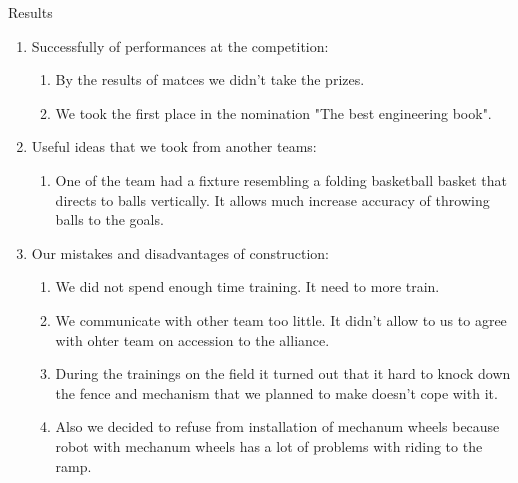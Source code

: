 Results
\begin{enumerate}
  \item Successfully of performances at the competition:
  \begin{enumerate}
	\item By the results of matces we didn't take the prizes.
	
	\item We took the first place in the nomination "The best engineering book".
	
  \end{enumerate}
  
  \item Useful ideas that we took from another teams:
  \begin{enumerate}
  	
	
	
	
	
	
	\item One of the team had a fixture resembling a folding basketball basket that directs to balls vertically. It allows much increase accuracy of throwing balls to the goals.
	
  \end{enumerate}
  
  \item Our mistakes and disadvantages of construction:
  \begin{enumerate}
  	\item We did not spend enough time training. It need to more train.
  	
  	\item We communicate with other team too little. It didn't allow to us to agree with ohter team on accession to the alliance.
  	
  	\item During the trainings on the field it turned out that it hard to knock down the fence and mechanism that we planned to make doesn't cope with it.
  	
  	\item Also we decided to refuse from installation of mechanum wheels because robot with mechanum wheels has a lot of problems with riding to the ramp.
  	

\end{enumerate}
\end{enumerate}
